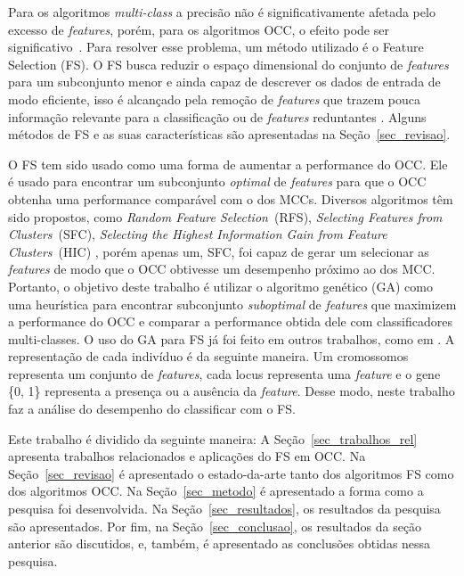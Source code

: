 \documentclass{article}
\begin{document}
Para os algoritmos \textit{multi-class} a precisão não é significativamente
afetada pelo excesso de \textit{features}, porém, para os algoritmos OCC, o
efeito pode ser significativo~\cite{Perera2019}. Para resolver esse problema, um
método utilizado é o Feature Selection (FS).  O FS busca reduzir o espaço
dimensional do conjunto de \textit{features} para um subconjunto menor e ainda
capaz de descrever os dados de entrada de modo eficiente, isso é alcançado pela
remoção de \textit{features} que trazem pouca informação relevante para a
classificação ou de \textit{features} reduntantes \cite{Chandrashekar2014}.
Alguns métodos de FS e as suas características são apresentadas na
Seção~\ref{sec_revisao}.

O FS tem sido usado como uma forma de aumentar a performance do OCC.  Ele é
usado para encontrar um subconjunto \textit{optimal} de \textit{features} para
que o OCC obtenha uma performance comparável com o dos MCCs. Diversos algoritmos
têm sido propostos, como \textit{Random Feature Selection}~(RFS),
\textit{Selecting Features from Clusters}~(SFC), \textit{Selecting the Highest
  Information Gain from Feature Clusters}~(HIC) \cite{Khalifa2016}, porém apenas
um, SFC, foi capaz de gerar um selecionar as \textit{features} de modo que o OCC
obtivesse um desempenho próximo ao dos MCC.  Portanto, o objetivo deste trabalho
é utilizar o algoritmo genético (GA) como uma heurística para encontrar
subconjunto \textit{suboptimal} de \textit{ features} que maximizem a
performance do OCC e comparar a performance obtida dele com classificadores
multi-classes. O uso do GA para FS já foi feito em outros trabalhos, como em
\cite{Chandrashekar2014}. A representação de cada indivíduo é da seguinte
maneira. Um cromossomos representa um conjunto de \textit{features}, cada locus
representa uma \textit{feature} e o gene \{0, 1\} representa a presença ou a
ausência da \textit{feature}. Desse modo, neste trabalho faz a análise do
desempenho do classificar com o FS.

Este trabalho é dividido da seguinte maneira: A Seção~\ref{sec_trabalhos_rel}
apresenta trabalhos relacionados e aplicações do FS em OCC. Na
Seção~\ref{sec_revisao} é apresentado o estado-da-arte tanto dos algoritmos FS
como dos algoritmos OCC. Na Seção~\ref{sec_metodo} é apresentado a forma
como a pesquisa foi desenvolvida. Na Seção~\ref{sec_resultados}, os resultados
da pesquisa são apresentados. Por fim, na Seção~\ref{sec_conclusao}, os
resultados da seção anterior são discutidos, e, também, é apresentado as
conclusões obtidas nessa pesquisa.
\end{document}
